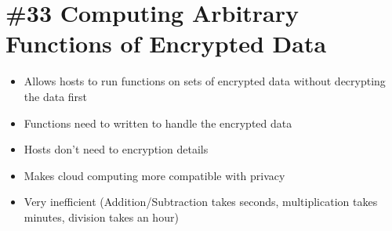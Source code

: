 \section{\#33 Computing Arbitrary Functions of Encrypted Data}
\begin{itemize}
	\item Allows hosts to run functions on sets of encrypted data without decrypting the data first
	\item Functions need to written to handle the encrypted data
	\item Hosts don't need to encryption details
	\item Makes cloud computing more compatible with privacy
	\item Very inefficient (Addition/Subtraction takes seconds, multiplication takes minutes, division takes an hour)
\end{itemize}